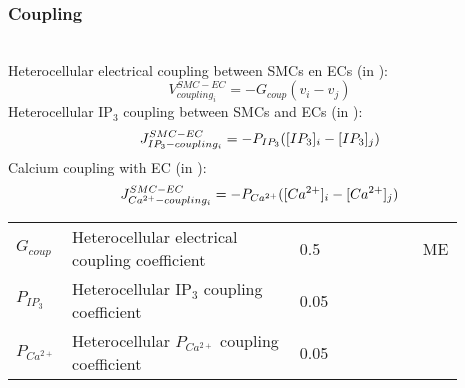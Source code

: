 \documentclass[fleqn]{report}
\numberwithin{equation}{section}
\numberwithin{equation}{section}
\begin{document}
 			\subsubsection*{Coupling}~\\
 			Heterocellular electrical coupling between SMCs en ECs (in \mVs):
 			\begin{equation} \label{eq:Vcouplingi}
 			V_{coupling_{i}}^{SMC-EC}= -G_{coup}(v_{i}-v_{j})
 			\end{equation}
 			Heterocellular IP$_{3}$ coupling between SMCs and ECs (in \uMs):
 			\begin{equation} \label{eq:JIP3couplingi}
 			J_{IP_{3}-coupling_{i}}^{SMC-EC}= -P_{IP_{3}}([IP_{3}]_{i}-[IP_{3}]_{j})
 			\end{equation}
 			Calcium coupling with EC (in \uMs):
 			\begin{equation} \label{eq:JCAcouplingi}
 			J_{Ca^{2+}-coupling_{i}}^{SMC-EC}= -P_{Ca^{2+}}([Ca^{2+}]_{i}-[Ca^{2+}]_{j})
 			\end{equation}
 
 			\begin{table}[h!]
 			\centering
 			\begin{tabular}{ p{0.09\linewidth}  >{\footnotesize} p{0.5\linewidth}  >{\footnotesize} p{0.27\linewidth} >{\footnotesize} p{0.03\linewidth} }
 			\hline
 			$G_{coup}$      		& Heterocellular electrical coupling coefficient		& 0.5 \pers	& ME \\
 			$P_{IP_{3}}$      		& Heterocellular IP$_{3}$ coupling coefficient	& 0.05 \pers	&  \cite{Koenigsberger2006} \\
 			$P_{Ca^{2+}}$      		& Heterocellular $P_{Ca^{2+}}$ coupling coefficient	& 0.05 \pers	&  \cite{Koenigsberger2006} \\
 			\hline
 			\end{tabular}
 			\label{tab:JCA3couplingi}
 			\end{table}
 			
\end{document}
